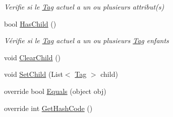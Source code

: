 \begin{DoxyCompactItemize}
\begin{DoxyCompactList}\small\item\em Verifie si le \mbox{\hyperlink{class_m_t_connect_agent_1_1_model_1_1_tag}{Tag}} actuel a un ou plusieurs attribut(s) \end{DoxyCompactList}\item 
bool \mbox{\hyperlink{class_m_t_connect_agent_1_1_model_1_1_tag_a0c2f62177d2c1c2db233e2adaef5a54c}{Has\+Child}} ()
\begin{DoxyCompactList}\small\item\em Vérifie si le \mbox{\hyperlink{class_m_t_connect_agent_1_1_model_1_1_tag}{Tag}} actuel a un ou plusieurs \mbox{\hyperlink{class_m_t_connect_agent_1_1_model_1_1_tag}{Tag}} enfants \end{DoxyCompactList}\item 
void \mbox{\hyperlink{class_m_t_connect_agent_1_1_model_1_1_tag_aa8b2a0cdde372d0807a65c4e2f8d6eb3}{Clear\+Child}} ()
\item 
void \mbox{\hyperlink{class_m_t_connect_agent_1_1_model_1_1_tag_ade18884a935ab5ad28d33510fa0ea4c5}{Set\+Child}} (List$<$ \mbox{\hyperlink{class_m_t_connect_agent_1_1_model_1_1_tag}{Tag}} $>$ child)
\item 
override bool \mbox{\hyperlink{class_m_t_connect_agent_1_1_model_1_1_tag_aa32ef3799aad040e97a9d2f49b93a1b9}{Equals}} (object obj)
\item 
override int \mbox{\hyperlink{class_m_t_connect_agent_1_1_model_1_1_tag_ad7cead371724ffe7dccca547548c65b4}{Get\+Hash\+Code}} ()
\end{DoxyCompactItemize}
